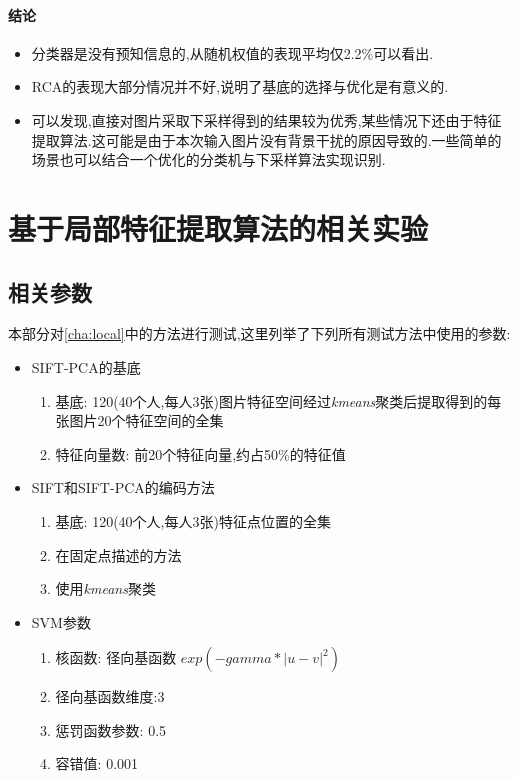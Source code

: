 \paragraph{结论}
\begin{itemize}
	\item 分类器是没有预知信息的,从随机权值的表现平均仅2.2\%可以看出.
	\item RCA的表现大部分情况并不好,说明了基底的选择与优化是有意义的.
	\item 可以发现,直接对图片采取下采样得到的结果较为优秀,某些情况下还由于特征提取算法.这可能是由于本次输入图片没有背景干扰的原因导致的.一些简单的场景也可以结合一个优化的分类机与下采样算法实现识别.
\end{itemize}
\section{基于局部特征提取算法的相关实验}
\label{sec:comp_local}

\subsection{相关参数}
本部分对\ref{cha:local}中的方法进行测试,这里列举了下列所有测试方法中使用的参数:

\begin{itemize}
	\item SIFT-PCA的基底 \begin{enumerate}
	\item 基底: 120(40个人,每人3张)图片特征空间经过\textit{kmeans}聚类后提取得到的每张图片20个特征空间的全集
	\item 特征向量数: 前20个特征向量,约占50\%的特征值
	\end{enumerate}
	
	\item SIFT和SIFT-PCA的编码方法 \begin{enumerate}
\item 基底: 120(40个人,每人3张)特征点位置的全集
	\item 在固定点描述的方法
	\item 使用\textit{kmeans}聚类	\end{enumerate}
	
	\item SVM参数 \begin{enumerate}
	\item 核函数: 径向基函数 $exp(-gamma*|u-v|^2)$
		\item 径向基函数维度:3
		\item 惩罚函数参数: 0.5
		\item 容错值: 0.001	\end{enumerate}
	
\end{itemize}




